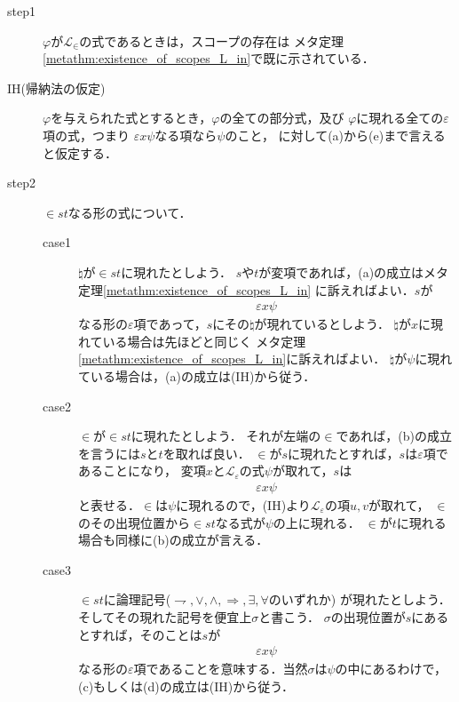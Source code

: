 	\begin{metaprf}\mbox{}
		\begin{description}
			\item[step1]
				$\varphi$が$\mathcal{L}_{\in}$の式であるときは，スコープの存在は
				メタ定理\ref{metathm:existence_of_scopes_L_in}で既に示されている．
				
			
			\item[IH(帰納法の仮定)]
				$\varphi$を与えられた式とするとき，$\varphi$の全ての部分式，及び
				$\varphi$に現れる全ての$\varepsilon$項の式，つまり
				$\varepsilon x \psi$なる項なら$\psi$のこと，
				に対して(a)から(e)まで言えると仮定する．
				
			\item[step2]
				$\in s t$なる形の式について．
				\begin{description}
					\item[case1]
						$\natural$が$\in s t$に現れたとしよう．
						$s$や$t$が変項であれば，(a)の成立はメタ定理\ref{metathm:existence_of_scopes_L_in}
						に訴えればよい．$s$が
						\begin{align}
							\varepsilon x \psi
						\end{align}
						なる形の$\varepsilon$項であって，$s$にその$\natural$が現れているとしよう．
						$\natural$が$x$に現れている場合は先ほどと同じく
						メタ定理\ref{metathm:existence_of_scopes_L_in}に訴えればよい．
						$\natural$が$\psi$に現れている場合は，(a)の成立は(IH)から従う．
						
					\item[case2]
						$\in$が$\in s t$に現れたとしよう．
						それが左端の$\in$であれば，(b)の成立を言うには$s$と$t$を取れば良い．
						$\in$が$s$に現れたとすれば，$s$は$\varepsilon$項であることになり，
						変項$x$と$\mathcal{L}_{\varepsilon}$の式$\psi$が取れて，$s$は
						\begin{align}
							\varepsilon x \psi
						\end{align}
						と表せる．$\in$は$\psi$に現れるので，(IH)より$\mathcal{L}_{\varepsilon}$の項$u,v$が取れて，
						$\in$のその出現位置から$\in s t$なる式が$\psi$の上に現れる．
						$\in$が$t$に現れる場合も同様に(b)の成立が言える．
				
					\item[case3]
						$\in s t$に論理記号($\rightharpoondown,\vee,\wedge,\Longrightarrow,\exists,\forall$のいずれか)
						が現れたとしよう．
						そしてその現れた記号を便宜上$\sigma$と書こう．
						$\sigma$の出現位置が$s$にあるとすれば，そのことは$s$が
						\begin{align}
							\varepsilon x \psi
						\end{align}
						なる形の$\varepsilon$項であることを意味する．当然$\sigma$は$\psi$の中にあるわけで，
						(c)もしくは(d)の成立は(IH)から従う．
						

\end{description}
\end{description}
\end{metaprf}
